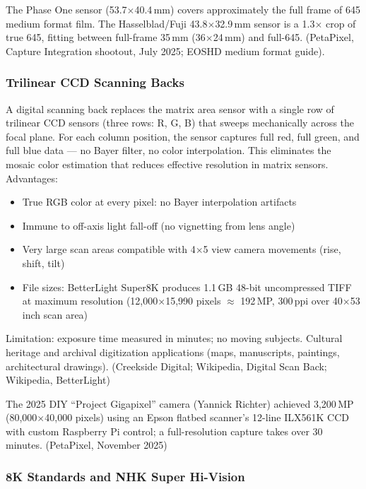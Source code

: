 \documentclass[11pt,letterpaper]{article}
\begin{document}
The Phase One sensor (53.7$\times$40.4\,mm) covers approximately the full frame of 645 medium
format film. The Hasselblad/Fuji 43.8$\times$32.9\,mm sensor is a 1.3$\times$ crop of true 645,
fitting between full-frame 35\,mm (36$\times$24\,mm) and full-645. (PetaPixel, Capture Integration
shootout, July 2025; EOSHD medium format guide).

\subsubsection{Trilinear CCD Scanning Backs}

A digital scanning back replaces the matrix area sensor with a single row of trilinear CCD sensors
(three rows: R, G, B) that sweeps mechanically across the focal plane. For each column position, the
sensor captures full red, full green, and full blue data --- no Bayer filter, no color interpolation.
This eliminates the mosaic color estimation that reduces effective resolution in matrix sensors.
Advantages:
\begin{itemize}[leftmargin=*]
  \item True RGB color at every pixel: no Bayer interpolation artifacts
  \item Immune to off-axis light fall-off (no vignetting from lens angle)
  \item Very large scan areas compatible with 4$\times$5 view camera movements (rise, shift, tilt)
  \item File sizes: BetterLight Super8K produces 1.1\,GB 48-bit uncompressed TIFF at maximum resolution
        (12,000$\times$15,990 pixels $\approx$ 192\,MP, 300\,ppi over 40$\times$53 inch scan area)
\end{itemize}
Limitation: exposure time measured in minutes; no moving subjects. Cultural heritage and archival
digitization applications (maps, manuscripts, paintings, architectural drawings).
(Creekside Digital; Wikipedia, Digital Scan Back; Wikipedia, BetterLight)

The 2025 DIY ``Project Gigapixel'' camera (Yannick Richter) achieved 3,200\,MP (80,000$\times$40,000
pixels) using an Epson flatbed scanner's 12-line ILX561K CCD with custom Raspberry Pi control;
a full-resolution capture takes over 30 minutes. (PetaPixel, November 2025)

\subsubsection{8K Standards and NHK Super Hi-Vision}
\end{document}
